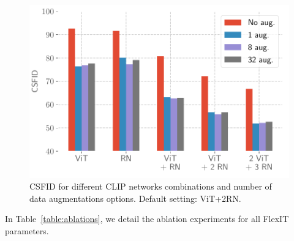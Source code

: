 \begin{figure}
    \centering
    \vspace{-1em}
    \includegraphics[width=.9\linewidth]{images/flexit/assets/naug_nnets.pdf}
    \caption{CSFID for different CLIP networks combinations and number of data augmentations options. Default setting: ViT+2RN.}
    \label{fig:augs}
    \vspace{-1em}
\end{figure}


In Table~\ref{table:ablations}, we detail the ablation experiments for all FlexIT parameters.

